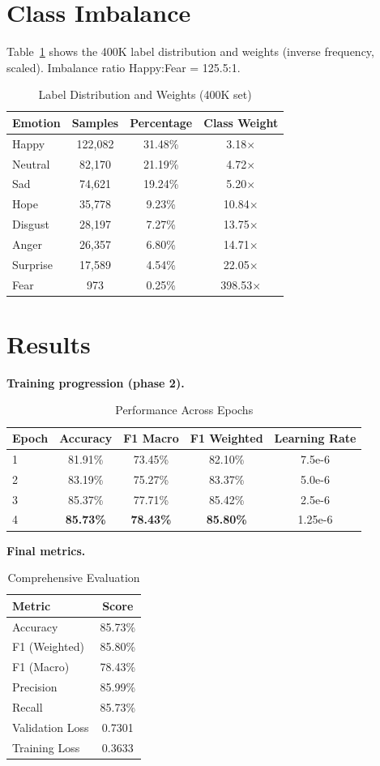 \documentclass[11pt]{article}
\begin{document}
\section{Class Imbalance}
Table~\ref{tab:dist} shows the 400K label distribution and weights (inverse frequency, scaled). Imbalance ratio Happy:Fear = 125.5:1.
\begin{table}[h]
\centering
\caption{Label Distribution and Weights (400K set)}
\label{tab:dist}
\begin{tabular}{lccc}
\toprule
Emotion & Samples & Percentage & Class Weight \\
\midrule
Happy & 122{,}082 & 31.48\% & 3.18$\times$ \\
Neutral & 82{,}170 & 21.19\% & 4.72$\times$ \\
Sad & 74{,}621 & 19.24\% & 5.20$\times$ \\
Hope & 35{,}778 & 9.23\% & 10.84$\times$ \\
Disgust & 28{,}197 & 7.27\% & 13.75$\times$ \\
Anger & 26{,}357 & 6.80\% & 14.71$\times$ \\
Surprise & 17{,}589 & 4.54\% & 22.05$\times$ \\
Fear & 973 & 0.25\% & 398.53$\times$ \\
\bottomrule
\end{tabular}
\end{table}

\section{Results}
\textbf{Training progression (phase 2).}
\begin{table}[h]
\centering
\caption{Performance Across Epochs}
\begin{tabular}{lcccc}
\toprule
Epoch & Accuracy & F1 Macro & F1 Weighted & Learning Rate \\
\midrule
1 & 81.91\% & 73.45\% & 82.10\% & 7.5e-6 \\
2 & 83.19\% & 75.27\% & 83.37\% & 5.0e-6 \\
3 & 85.37\% & 77.71\% & 85.42\% & 2.5e-6 \\
4 & \textbf{85.73\%} & \textbf{78.43\%} & \textbf{85.80\%} & 1.25e-6 \\
\bottomrule
\end{tabular}
\end{table}

\textbf{Final metrics.}
\begin{table}[h]
\centering
\caption{Comprehensive Evaluation}
\begin{tabular}{lc}
\toprule
Metric & Score \\
\midrule
Accuracy & 85.73\% \\
F1 (Weighted) & 85.80\% \\
F1 (Macro) & 78.43\% \\
Precision & 85.99\% \\
Recall & 85.73\% \\
Validation Loss & 0.7301 \\
Training Loss & 0.3633 \\
\bottomrule
\end{tabular}
\end{table}
\end{document}
